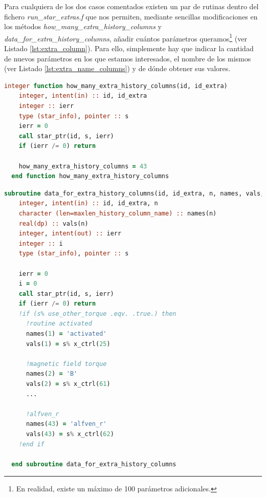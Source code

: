 Para cualquiera de los dos casos comentados existen un par de rutinas dentro del fichero \textit{run\_star\_extras.f} que nos permiten, mediante sencillas modificaciones en los métodos \textit{how\_many\_extra\_history\_columns} y \textit{data\_for\_extra\_history\_columns}, añadir cuántos parámetros queramos\footnote{En realidad, existe un máximo de 100 parámetros adicionales.} (ver Listado \ref{lst:extra_column}). Para ello, simplemente hay que indicar la cantidad de nuevos parámetros en los que estamos interesados, el nombre de los mismos (ver Listado \ref{lst:extra_name_columns}) y de dónde obtener sus valores.\par

\begin{lstlisting}[language=Fortran, float, caption={Configuración del número de parámetros adicionales a incluir en el fichero de salida.}, label={lst:extra_columns}]
  integer function how_many_extra_history_columns(id, id_extra)
    integer, intent(in) :: id, id_extra
    integer :: ierr
    type (star_info), pointer :: s
    ierr = 0
    call star_ptr(id, s, ierr)
    if (ierr /= 0) return

    how_many_extra_history_columns = 43
  end function how_many_extra_history_columns
\end{lstlisting}

\begin{lstlisting}[language=Fortran, float, caption={Definición de los nombres de los campos adicionales a aparecer en el fichero de salida.}, label={lst:extra_name_columns}]
  subroutine data_for_extra_history_columns(id, id_extra, n, names, vals, ierr)
    integer, intent(in) :: id, id_extra, n
    character (len=maxlen_history_column_name) :: names(n)
    real(dp) :: vals(n)
    integer, intent(out) :: ierr
    integer :: i
    type (star_info), pointer :: s

    ierr = 0
    i = 0
    call star_ptr(id, s, ierr)
    if (ierr /= 0) return
    !if (s% use_other_torque .eqv. .true.) then
      !routine activated
      names(1) = 'activated'
      vals(1) = s% x_ctrl(25) 

      !magnetic field torque
      names(2) = 'B'
      vals(2) = s% x_ctrl(61)
      ...

      !alfven_r
      names(43) = 'alfven_r'
      vals(43) = s% x_ctrl(62)
    !end if

  end subroutine data_for_extra_history_columns

\end{lstlisting}

